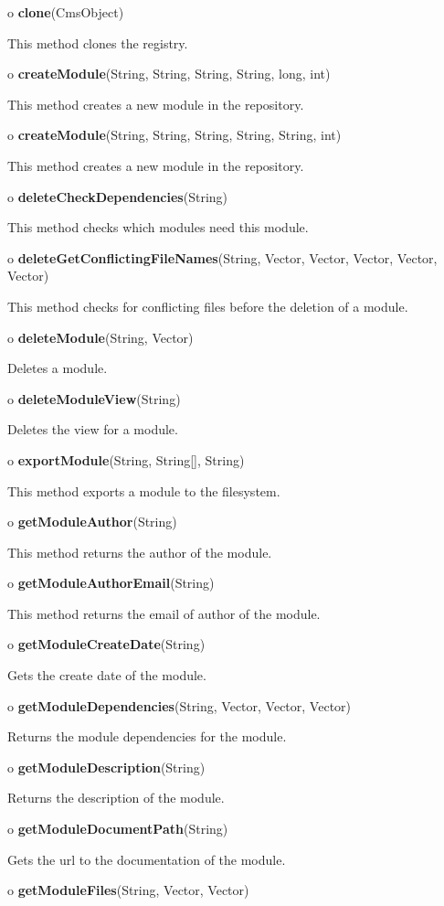 \begin{description}
\item o {\bf clone}(CmsObject)  

This method clones the registry.  
\item o {\bf createModule}(String, String, String, String, long, int)  

This method creates a new module in the repository.  
\item o {\bf createModule}(String, String, String, String, String, int)  

This method creates a new module in the repository.  
\item o {\bf deleteCheckDependencies}(String)  

This method checks which modules need this module.  
\item o {\bf deleteGetConflictingFileNames}(String, Vector, Vector, Vector,
Vector, Vector)  

This method checks for conflicting files before the deletion of a module.  
\item o {\bf deleteModule}(String, Vector)  

Deletes a module.  
\item o {\bf deleteModuleView}(String)  

Deletes the view for a module.  
\item o {\bf exportModule}(String, String[], String)  

This method exports a module to the filesystem.  
\item o {\bf getModuleAuthor}(String)  

This method returns the author of the module.  
\item o {\bf getModuleAuthorEmail}(String)  

This method returns the email of author of the module.  
\item o {\bf getModuleCreateDate}(String)  

Gets the create date of the module.  
\item o {\bf getModuleDependencies}(String, Vector, Vector, Vector)  

Returns the module dependencies for the module.  
\item o {\bf getModuleDescription}(String)  

Returns the description of the module.  
\item o {\bf getModuleDocumentPath}(String)  

Gets the url to the documentation of the module.  
\item o {\bf getModuleFiles}(String, Vector, Vector)  


\end{description}
